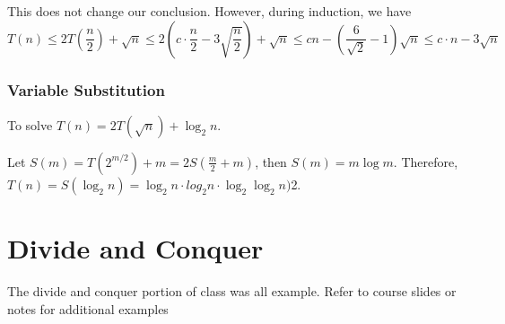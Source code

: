 \documentclass[twoside]{article}
\begin{document}
This does not change our conclusion. However, during induction, we have 
\[T(n) \leq 2T(\frac{n}{2}) + \sqrt{n} \leq 2\left(c \cdot \frac{n}{2} - 3 \sqrt{\frac{n}{2}} \right) + \sqrt{n} \leq cn - \left(\frac{6}{\sqrt{2}} - 1\right) \sqrt{n} \leq c \cdot n -  3\sqrt{n}\]

\subsubsection{Variable Substitution}
To solve \(T(n) = 2T(\sqrt{n}) + \log_2 n\). 

Let \(S(m) = T(2^{m/2}) + m = 2S(\frac{m}{2} + m)\), then \(S(m) = m \log m \). Therefore, \(T(n) = S(\log_2 n) = \log_2 n \cdot log_2 n \cdot \log_2 \log_2 n)\)2. 

\section{Divide and Conquer}
The divide and conquer portion of class was all example. Refer to course slides or notes for additional examples
\end{document}
